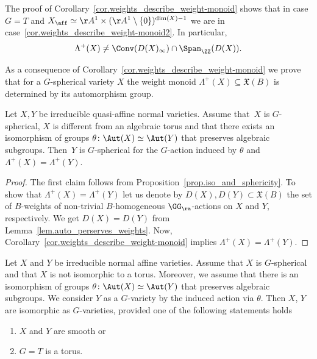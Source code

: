 \begin{remark}
\label{rem.special_case}
The proof of Corollary~\ref{cor.weights_describe_weight-monoid} shows that
in case $G = T$ and $X_{\aff} \simeq \AA^1 \times (\AA^1 \setminus \{0\})^{\dim(X)-1}$
we are in case~\ref{cor.weights_describe_weight-monoid2}. In particular,
\[
\Lambda^+(X) \neq \Conv ( D(X)_{\infty}) \cap \Span_{\ZZ}(D(X)).
\]
\end{remark}

As a consequence of Corollary~\ref{cor.weights_describe_weight-monoid} we prove that
for a $G$-spherical variety $X$ the weight monoid $\Lambda^+(X) \subseteq \mathfrak{X}(B)$
is determined by its automorphism group.

\begin{corollary}\label{thesameweights}
\label{cor.Autos_describe_weight_monoids}
Let $X, Y$ be irreducible quasi-affine normal varieties. Assume that~$X$ is $G$-spherical, $X$ is different from an algebraic torus and that
there exists an isomorphism of groups
$\theta \colon \Aut(X) \simeq \Aut(Y)$ that preserves
algebraic subgroups.
Then~$Y$ is $G$-spherical for the $G$-action induced by $\theta$
and $\Lambda^+(X) = \Lambda^+(Y)$.
\end{corollary}

\begin{proof}
The first claim follows from Proposition~\ref{prop.iso_and_sphericity}.
To show that $\Lambda^+(X) = \Lambda^+(Y)$ let us denote by
$D(X), D(Y) \subset \mathfrak{X}(B)$ the set of $B$-weights of non-trivial $B$-homo\-geneous $\GG_\ra$-actions
on $X$ and $Y$, respectively. We get $D(X) = D(Y)$ from Lemma~\ref{lem.auto_perserves_weights}.
Now, Corollary~\ref{cor.weights_describe_weight-monoid} implies $\Lambda^+(X) = \Lambda^+(Y)$.
\end{proof}

\begin{theorem}
\label{thm.smooth_spherical_var}
Let $X$ and $Y$ be irreducible normal affine varieties. Assume that
$X$ is $G$-spherical and that $X$ is not isomorphic
to a torus. Moreover, we assume that there is an isomorphism of groups
$\theta \colon \Aut(X) \simeq \Aut(Y)$ that preserves
algebraic subgroups. We consider $Y$ as a $G$-variety by the induced action via $\theta$. Then
$X$, $Y$ are isomorphic as $G$-varieties, provided one of the following statements holds
\begin{enumerate}\renewcommand{\theenumi}{\alph{enumi}}
\item \label{thm.smooth_spherical_var_cond_a} $X$ and $Y$ are smooth or
\item \label{thm.smooth_spherical_var_cond_b} $G = T$ is a torus.
\end{enumerate}
\end{theorem}

